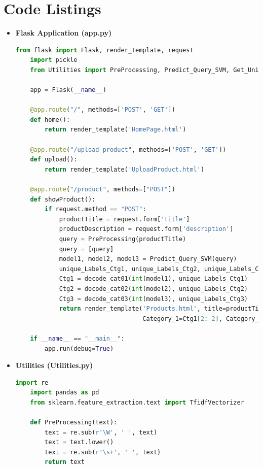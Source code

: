 \documentclass[10pt]{article}
\begin{document}
\section{Code Listings}
\begin{itemize}
  \item \textbf{Flask Application (app.py)}
    \begin{lstlisting}[language=Python]
    from flask import Flask, render_template, request
    import pickle
    from Utilities import PreProcessing, Predict_Query_SVM, Get_Unique_Labels, decode_cat01, decode_cat02, decode_cat03
    
    app = Flask(__name__)
    
    @app.route("/", methods=['POST', 'GET'])
    def home():
        return render_template('HomePage.html')
    
    @app.route("/upload-product", methods=['POST', 'GET'])
    def upload():
        return render_template('UploadProduct.html')
    
    @app.route("/product", methods=["POST"])
    def showProduct():
        if request.method == "POST":
            productTitle = request.form['title']
            productDescription = request.form['description']
            query = PreProcessing(productTitle)
            query = [query]
            model1, model2, model3 = Predict_Query_SVM(query)
            unique_Labels_Ctg1, unique_Labels_Ctg2, unique_Labels_Ctg3 = Get_Unique_Labels()
            Ctg1 = decode_cat01(int(model1), unique_Labels_Ctg1)
            Ctg2 = decode_cat02(int(model2), unique_Labels_Ctg2)
            Ctg3 = decode_cat03(int(model3), unique_Labels_Ctg3)
            return render_template('Products.html', title=productTitle, description=productDescription, 
                                   Category_1=Ctg1[2:-2], Category_2=Ctg2[2:-2], Category_3=Ctg3[2:-2])
    
    if __name__ == "__main__":
        app.run(debug=True)
    \end{lstlisting}

  \item \textbf{Utilities (Utilities.py)}
    \begin{lstlisting}[language=Python]
    import re
    import pandas as pd
    from sklearn.feature_extraction.text import TfidfVectorizer
    
    def PreProcessing(text):
        text = re.sub(r'\W', ' ', text)
        text = text.lower()
        text = re.sub(r'\s+', ' ', text)
        return text
    

\end{lstlisting}
\end{itemize}
\end{document}
